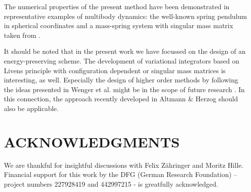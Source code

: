 \documentclass{multibody2023_full_paper}
\begin{document}
The numerical properties of the present method have been demonstrated in representative examples of multibody dynamics: the well-known spring pendulum in spherical coordinates and a mass-spring system with singular mass matrix taken from \cite{udwadia06}.

It should be noted that in the present work we have focussed on the design of an energy-preserving scheme. The development of variational integrators based on Livens principle with configuration dependent or singular mass matrices is interesting, as well. Especially the design of higher order methods by following the ideas presented in Wenger et al. \cite{wenger_construction_2017} might be in the scope of future research . In this connection, the approach recently developed in Altmann \& Herzog \cite{altmann22} should also be applicable.

\section*{ACKNOWLEDGMENTS}
We are thankful for insightful discussions with Felix Zähringer and Moritz Hille. Financial support for this work by the DFG (German Research Foundation) – project numbers 227928419 and 442997215 - is greatfully acknowledged.

\end{document}
